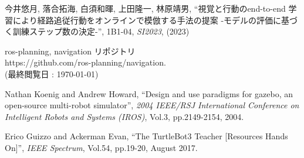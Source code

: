 \documentclass{jarticle}
\begin{document}
\begin{thebibliography}{99}
今井悠月, 落合拓海, 白須和暉, 上田隆一, 林原靖男, “視覚と行動のend-to-end 学習により経路追従行動をオンラインで模倣する手法の提案 -モデルの評価に基づく訓練ステップ数の決定-”, 1B1-04, \textit{SI2023}, (2023)

ros-planning, navigation リポジトリ\\
https://github.com/ros-planning/navigation.\\
(最終閲覧日 : \today)

Nathan Koenig and Andrew Howard, “Design and use paradigms for gazebo, an open-source multi-robot simulator”, \textit{2004 IEEE/RSJ International Conference on Intelligent Robots and Systems (IROS)}, Vol.3, pp.2149-2154, 2004.

Erico Guizzo and Ackerman Evan, “The TurtleBot3 Teacher [Resources Hands On]”, \textit{IEEE Spectrum}, Vol.54, pp.19-20, August 2017.

\end{thebibliography}


\normalsize
\end{document}
